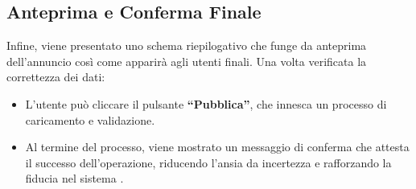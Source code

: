 \subsection*{Anteprima e Conferma Finale}
Infine, viene presentato uno schema riepilogativo che funge da anteprima dell’annuncio così come apparirà agli utenti finali. Una volta verificata la correttezza dei dati:
\begin{itemize}
    \item L’utente può cliccare il pulsante \textbf{“Pubblica”}, che innesca un processo di caricamento e validazione.
    \item Al termine del processo, viene mostrato un messaggio di conferma che attesta il successo dell’operazione, riducendo l’ansia da incertezza e rafforzando la fiducia nel sistema \cite{nielsen1995}.
\end{itemize}

\newpage













